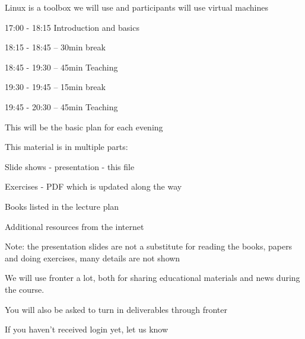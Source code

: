 \documentclass[Screen16to9,17pt]{foils}
\begin{document}
Linux is a toolbox we will use and participants will use virtual machines



\begin{list1}
\item 17:00 - 18:15
Introduction and basics
\item 18:15 - 18:45 -- 30min break
\item 18:45 - 19:30 -- 45min Teaching
\item 19:30 - 19:45 -- 15min break
\item 19:45 - 20:30 -- 45min Teaching
\end{list1}

\vskip 1cm
\centerline{\Large This will be the basic plan for each evening}


\begin{list1}
\item This material is in multiple parts:
\begin{list2}
\item Slide shows - presentation - this file
\item Exercises - PDF which is updated along the way
\end{list2}
\item Books listed in the lecture plan
\item Additional resources from the internet
\item Note: the presentation slides are not a substitute for reading the books, papers and doing exercises, many details are not shown
\end{list1}





We will use fronter a lot, both for sharing educational materials and news during the course.

You will also be asked to turn in deliverables through fronter


\vskip 5mm
\centerline{If you haven't received login yet, let us know}


\end{document}
